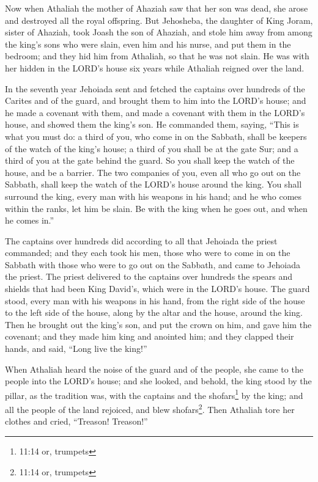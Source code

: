 \mychapter{} \myverse*{}Now when Athaliah the mother of Ahaziah saw that her son was dead,
she arose and destroyed all the royal offspring.
\myverse{}But Jehosheba, the daughter of King Joram, sister of Ahaziah, took Joash the
son of Ahaziah, and stole him away from among the king’s sons who were slain, even him and his nurse,
and put them in the bedroom; and they hid him from Athaliah, so that he was not slain.
\myverse{}He was with her hidden in the LORD’s house six years while Athaliah reigned
over the land.

\myverse{}In the seventh year Jehoiada sent and fetched the captains over
hundreds of the Carites and of the guard, and brought them to him into the LORD’s house; and he made a
covenant with them, and made a covenant with them in the LORD’s house, and showed them the king’s son.
\myverse{}He commanded them, saying, “This is what you must do: a third of you, who come
in on the Sabbath, shall be keepers of the watch of the king’s house;
\myverse{}a third of you shall be at the gate Sur; and a third of you at the gate behind
the guard. So you shall keep the watch of the house, and be a barrier.
\myverse{}The two companies of you, even all who go out on the Sabbath, shall keep the
watch of the LORD’s house around the king.
\myverse{}You shall surround the king, every man with his weapons in his hand; and he
who comes within the ranks, let him be slain. Be with the king when he goes out, and when he comes in.”

\myverse{}The captains over hundreds did according to all that Jehoiada
the priest commanded; and they each took his men, those who were to come in on the Sabbath with those
who were to go out on the Sabbath, and came to Jehoiada the priest.
\myverse{}The priest delivered to the captains over hundreds the spears and shields
that had been King David’s, which were in the LORD’s house.
\myverse{}The guard stood, every man with his weapons in his hand, from the right side
of the house to the left side of the house, along by the altar and the house, around the king.
\myverse{}Then he brought out the king’s son, and put the crown on him, and gave him
the covenant; and they made him king and anointed him; and they clapped their hands, and said, “Long live
the king!”

\myverse{}When Athaliah heard the noise of the guard and of the people,
she came to the people into the LORD’s house;
\myverse{}and she looked, and behold, the king stood by the pillar, as the tradition
was, with the captains and the shofars\footnote{11:14 or, trumpets} by the king; and all the people of
the land rejoiced, and blew shofars\footnote{11:14 or, trumpets}. Then Athaliah tore her clothes and
cried, “Treason! Treason!”

